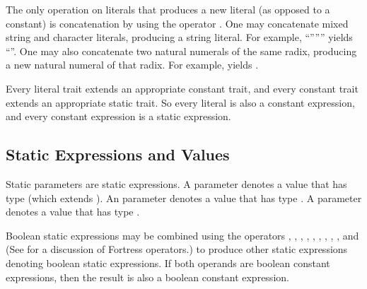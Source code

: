 The only operation on literals that produces a new literal (as opposed
to a constant) is concatenation by using the operator \EXP{\|}.
One may concatenate mixed string and
character literals, producing a string literal.
For example, ``''\EXP{\|}'''' yields ``''.
One may also concatenate two natural numerals
of the same radix, producing a new natural numeral of that radix.
For example,  yields .

Every literal trait extends an appropriate constant trait, and every
constant trait extends an appropriate static trait.  So every
literal is also a constant expression, and every constant expression
is a static expression.




\subsection{Static Expressions and Values}

Static parameters are static expressions.
A  parameter denotes a value that has type 
(which extends ).
An  parameter denotes a value that has type .
A  parameter denotes a value that has type .


Boolean static expressions may be combined using the operators
\EXP{\wedge}, \EXP{\vee}, \EXP{\oplus},
\EXP{\equiv}, \EXP{\leftrightarrow}, , , \EXP{=},
\EXP{\neq}, and \EXP{\rightarrow} (See  for a
discussion of Fortress operators.)
to produce other static expressions denoting boolean static expressions.
If both operands are boolean constant expressions, then the result is also
a boolean constant expression.

